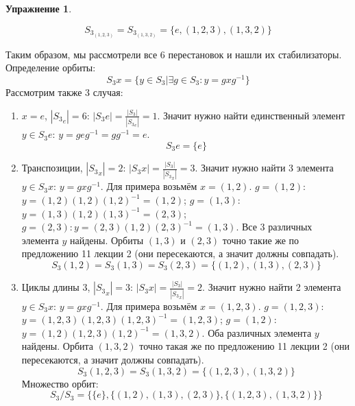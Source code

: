 \documentclass[12pt]{article}
\theoremstyle{definition}
\newtheorem{upr}[zad]{Упражнение}
\begin{document}
\begin{upr}
\begin{enumerate}
    \begin{equation}
        \boxed{S_{3_{(1,2,3)}}=S_{3_{(1,3,2)}}=\{e,(1,2,3),(1,3,2)\}}
    \end{equation}
\end{enumerate}
Таким образом, мы рассмотрели все 6 перестановок и нашли их стабилизаторы.\\
Определение орбиты:
\begin{equation}
    S_3x=\{y\in S_3|\exists g\in S_3: y=gxg^{-1}\}
\end{equation}
Рассмотрим также 3 случая:
\begin{enumerate}
    \item $x=e$, $|{S_3}_e|=6$: $|S_3e|=\frac{|S_3|}{|{S_3}_e|}=1$. Значит нужно найти единственный элемент $y\in S_3e$: $y=geg^{-1}=gg^{-1}=e$.
    \begin{equation}
        \boxed{S_3e=\{e\}}
    \end{equation}
    \item Транспозиции, $|{S_3}_x|=2$: $|S_3x|=\frac{|S_3|}{|{S_3}_x|}=3$. Значит нужно найти 3 элемента $y\in S_3x$: $y=gxg^{-1}$. Для примера возьмём $x=(1,2)$. $g=(1,2)$: $y=(1,2)(1,2)(1,2)^{-1}=(1,2)$; $g=(1,3)$: $y=(1,3)(1,2)(1,3)^{-1}=(2,3)$; $g=(2,3): y=(2,3)(1,2)(2,3)^{-1}=(1,3)$. Все 3 различных элемента $y$ найдены. Орбиты $(1,3)$ и $(2,3)$ точно такие же по предложению 11 лекции 2 (они пересекаются, а значит должны совпадать).
    \begin{equation}
        \boxed{S_3(1,2)=S_3(1,3)=S_3(2,3)=\{(1,2),(1,3),(2,3)\}}
    \end{equation}
    \item Циклы длины 3, $|{S_3}_x|=3$: $|S_3x|=\frac{|S_3|}{|{S_3}_x|}=2$. Значит нужно найти 2 элемента $y\in S_3x$: $y=gxg^{-1}$. Для примера возьмём $x=(1,2,3)$. $g=(1,2,3)$: $y=(1,2,3)(1,2,3)(1,2,3)^{-1}=(1,2,3)$; $g=(1,2)$: $y=(1,2)(1,2,3)(1,2)^{-1}=(1,3,2)$. Оба различных элемента $y$ найдены. Орбита $(1,3,2)$ точно такая же по предложению 11 лекции 2 (они пересекаются, а значит должны совпадать).
    \begin{equation}
        \boxed{S_3(1,2,3)=S_3(1,3,2)=\{(1,2,3),(1,3,2)\}}
    \end{equation}
    Множество орбит:
    \begin{equation}
        \boxed{S_3/S_3=\{\{e\},\{(1,2),(1,3),(2,3)\},\{(1,2,3),(1,3,2)\}\}}
    \end{equation}
\end{enumerate}
\end{upr}
\end{document}
